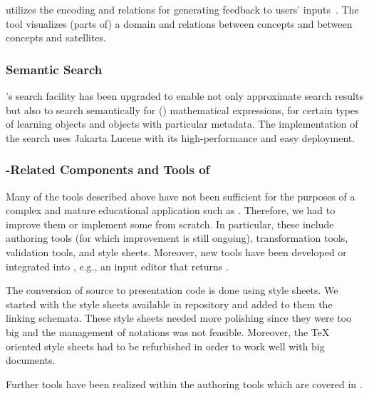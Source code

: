 {} utilizes the {\omdoc} encoding and relations for generating feedback to
users' inputs~\cite{MelisKaergerHomikcmapDelphi05}. The tool visualizes (parts of) a
domain and relations between concepts and between concepts and satellites.


\subsubsection{Semantic Search}

{\activemath}'s search facility has been upgraded to enable not only approximate search
results but also to search semantically for ({\openmath}) mathematical expressions, for
certain types of learning objects and objects with particular metadata.
The implementation of the search uses Jakarta Lucene with its high-performance
and easy deployment.

\subsubsection{{\omdoc}-Related Components and Tools of {\activemath}}

Many of the tools described above have not been sufficient for the purposes of a complex
and mature educational application such as {\activemath}.  Therefore, we had to improve
them or implement some from scratch. In particular, these include authoring tools (for
which improvement is still ongoing), transformation tools, validation tools, and
style sheets. Moreover, new tools have been developed or integrated into {\activemath},
e.g., an input editor that returns {\openmath}.

The conversion of {\omdoc} source to presentation code is done using {\xslt} style sheets. 
We started with the style sheets available in {\omdoc} repository and added to them the
{\activemath} linking schemata.
These style sheets needed more polishing since they were too big and the management of
notations was not feasible.  Moreover, the {\TeX} oriented style sheets had to be
refurbished in order to work well with big documents.

Further tools have been realized within the authoring tools which are covered in
{}.



